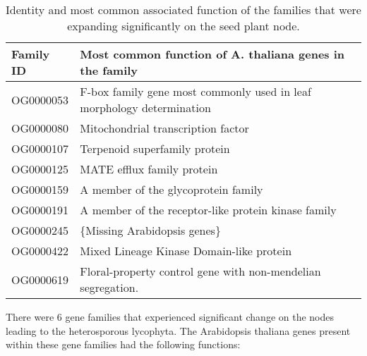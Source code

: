 \begin{table}[]
    \centering
    \begin{tabular}{|l|l|}
    \hline
    Family ID & Most common function of A. thaliana genes in the family               \\ \hline
    OG0000053 & F-box family gene most commonly used in leaf morphology determination \\ \hline
    OG0000080 & Mitochondrial transcription factor                                    \\ \hline
    OG0000107 & Terpenoid superfamily protein                                         \\ \hline
    OG0000125 & MATE efflux family protein                                            \\ \hline
    OG0000159 & A member of the glycoprotein family                                   \\ \hline
    OG0000191 & A member of the receptor-like protein kinase family                   \\ \hline
    OG0000245 & \{Missing Arabidopsis genes\}                                         \\ \hline
    OG0000422 & Mixed Lineage Kinase Domain-like protein                              \\ \hline
    OG0000619 & Floral-property control gene with non-mendelian segregation.          \\ \hline
    \end{tabular}
    \caption{Identity and most common associated function of the families that were expanding significantly on the seed plant node.}
    \label{Table 5.1}
    \end{table}

There were 6 gene families that experienced significant change on the nodes leading to the heterosporous lycophyta. The Arabidopsis thaliana genes present within these gene families had the following functions:

